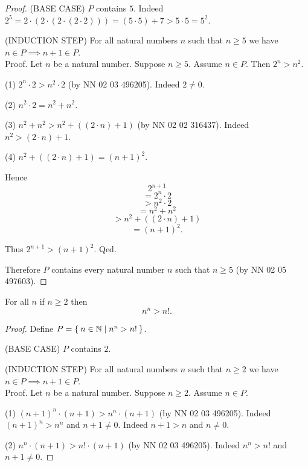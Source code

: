 \documentclass[../../natural-numbers.ftl.tex]{subfiles}
\begin{document}
\begin{forthel}
\begin{proof}
      (BASE CASE) $P$ contains $5$.
      Indeed $2^{5} = 2 \cdot (2 \cdot (2 \cdot (2 \cdot 2))) = (5 \cdot 5) + 7 > 5 \cdot 5 = 5^{2}$.

      (INDUCTION STEP) For all natural numbers $n$ such that $n \geq 5$ we have $n \in P \implies n + 1 \in P$. \\
      Proof.
        Let $n$ be a natural number.
        Suppose $n \geq 5$.
        Assume $n \in P$.
        Then $2^{n} > n^{2}$.

        (1) $2^{n} \cdot 2 > n^{2} \cdot 2$ (by NN 02 03 496205).
        Indeed $2 \neq 0$.

        (2) $n^{2} \cdot 2 = n^{2} + n^{2}$.

        (3) $n^{2} + n^{2} > n^{2} + ((2 \cdot n) + 1)$ (by NN 02 02 316437).
        Indeed $n^{2} > (2 \cdot n) + 1$.

        (4) $n^{2} + ((2 \cdot n) + 1) = (n + 1)^{2}$.

        Hence
        \[   2^{n + 1} \]
        \[ = 2^{n} \cdot 2 \]
        \[ > n^{2} \cdot 2 \]
        \[ = n^{2} + n^{2} \]
        \[ > n^{2} + ((2 \cdot n) + 1) \]
        \[ = (n + 1)^{2}. \]

        Thus $2^{n + 1} > (n + 1)^{2}$.
      Qed.

      Therefore $P$ contains every natural number $n$ such that $n \geq 5$ (by NN 02 05 497603).
    \end{proof}


    \begin{proposition}[NN 02 06 527159]
      For all $n$ if $n \geq 2$ then \[ n^{n} > n!. \]
    \end{proposition}
    \begin{proof}
      Define $P = \Set{n \in \mathbb{N} | n^{n} > n!}$.

      (BASE CASE) $P$ contains $2$.

      (INDUCTION STEP) For all natural numbers $n$ such that $n \geq 2$ we have $n \in P \implies n + 1 \in P$. \\
      Proof.
        Let $n$ be a natural number.
        Suppose $n \geq 2$.
        Assume $n \in P$.

        (1) $(n + 1)^{n} \cdot (n + 1) > n^{n} \cdot (n + 1)$ (by NN 02 03 496205).
        Indeed $(n + 1)^{n} > n^{n}$ and $n + 1 \neq 0$.
        Indeed $n + 1 > n$ and $n \neq 0$.

        (2) $n^{n} \cdot (n + 1) > n! \cdot (n + 1)$ (by NN 02 03 496205).
        Indeed $n^{n} > n!$ and $n + 1 \neq 0$.


\end{proof}
\end{forthel}
\end{document}
